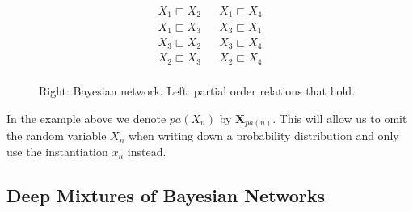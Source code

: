 \documentclass[letterpaper]{article} %
\newcommand{\Xvars}{\ensuremath{\mathbf{X}}}
\newcommand{\Xvar}{\ensuremath{X}}
\newcommand{\xvar}{\ensuremath{x}}
\newcommand{\parents}{\ensuremath{{pa}}}
\begin{document}
\begin{figure}


	\begin{minipage}{0.50\linewidth}
		\begin{align*}
			X_1 \sqsubset X_2 &  & X_1 \sqsubset X_4 \\
			X_1 \sqsubset X_3 &  & X_3 \sqsubset X_1 \\
			X_3 \sqsubset X_2 &  & X_3 \sqsubset X_4 \\
			X_2 \sqsubset X_3 &  & X_2 \sqsubset X_4 \\
		\end{align*}


	\end{minipage}%
	\begin{minipage}{0.49\linewidth}
	\end{minipage}
	\caption{Right: Bayesian network. Left: partial order relations that hold.}
	\label{fig:bn}
\end{figure}


In the example above we denote $\parents(X_n)$ by $\Xvars_{\parents(n)}$. This will allow us to omit the random variable $\Xvar_n$ when writing down a probability distribution and only use the instantiation $\xvar_n$ instead.






\subsection{Deep Mixtures of Bayesian Networks}
\label{sec:dmbn}
\end{document}
